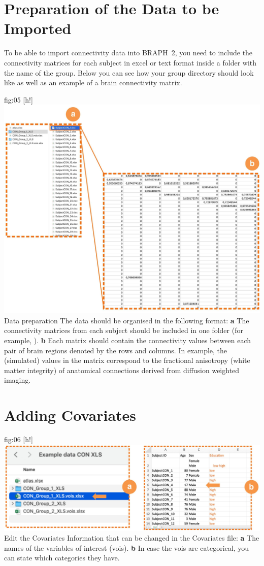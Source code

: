 \documentclass[justified]{tufte-handout}
\begin{document}
\clearpage
\section{Preparation of the Data to be Imported}

To be able to import connectivity data into BRAPH~2, you need to include the connectivity matrices for each subject in excel or text format inside a folder with the name of the group. Below you can see how your group directory should look like as well as an example of a brain connectivity matrix.

	{fig:05}
	{
	[h!]
	\includegraphics{fig05.jpg}
	}
	{Data preparation}
	{
	The data should be organised in the following format:
	{\bf a} The connectivity matrices from each subject should be included in one folder (for example, ). 
	{\bf b} Each matrix should contain the connectivity values between each pair of brain regions denoted by the rows and columns. In example, the (simulated) values in the matrix correspond to the fractional anisotropy (white matter integrity) of anatomical connections derived from diffusion weighted imaging.
	} 


\section{Adding Covariates}

	{fig:06}
	{
	[h!]
	\includegraphics{fig06.jpg}
	}
	{Edit the Covariates}
	{
	Information that can be changed in the Covariates file: 
	{\bf a} The names of the variables of interest (vois).
	{\bf b} In case the vois are categorical, you can state which categories they have.
	}
	
\end{document}
